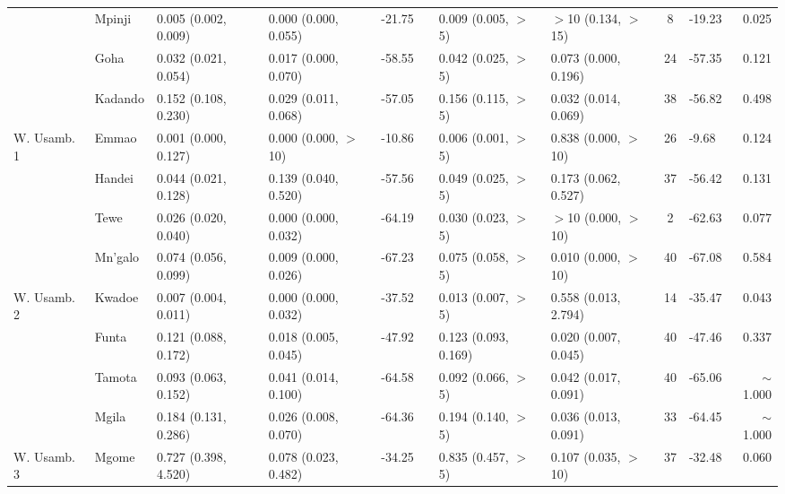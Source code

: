 \begin{tabular}{llllllllclr}
            & Mpinji          & 0.005 (0.002, 0.009)   & 0.000 (0.000, 0.055)   & -21.75   & & 0.009 (0.005, $>$5)   & $>$10 (0.134, $>$15)   & 8  & -19.23 & 0.025\\
            & Goha            & 0.032 (0.021, 0.054)   & 0.017 (0.000, 0.070)   & -58.55   & & 0.042 (0.025, $>$5)   & 0.073 (0.000, 0.196)   & 24 & -57.35 & 0.121\\
            & Kadando         & 0.152 (0.108, 0.230)   & 0.029 (0.011, 0.068)   & -57.05   & & 0.156 (0.115, $>$5)   & 0.032 (0.014, 0.069)   & 38 & -56.82 & 0.498\\
\cmidrule{2-11}
W. Usamb. 1 & Emmao           & 0.001 (0.000, 0.127)   & 0.000 (0.000, $>$10)   & -10.86   & & 0.006 (0.001, $>$5)   & 0.838 (0.000, $>$10)   & 26 &  -9.68 & 0.124\\
            & Handei          & 0.044 (0.021, 0.128)   & 0.139 (0.040, 0.520)   & -57.56   & & 0.049 (0.025, $>$5)   & 0.173 (0.062, 0.527)   & 37 & -56.42 & 0.131\\
            & Tewe            & 0.026 (0.020, 0.040)   & 0.000 (0.000, 0.032)   & -64.19   & & 0.030 (0.023, $>$5)   & $>$10 (0.000, $>$10)   & 2  & -62.63 & 0.077\\
            & Mn'galo         & 0.074 (0.056, 0.099)   & 0.009 (0.000, 0.026)   & -67.23   & & 0.075 (0.058, $>$5)   & 0.010 (0.000, $>$10)   & 40 & -67.08 & 0.584\\
\cmidrule{2-11}
W. Usamb. 2 & Kwadoe          & 0.007 (0.004, 0.011)   & 0.000 (0.000, 0.032)   & -37.52   & & 0.013 (0.007, $>$5)   & 0.558 (0.013, 2.794)   & 14 & -35.47 & 0.043\\
            & Funta           & 0.121 (0.088, 0.172)   & 0.018 (0.005, 0.045)   & -47.92   & & 0.123 (0.093, 0.169)  & 0.020 (0.007, 0.045)   & 40 & -47.46 & 0.337\\
            & Tamota          & 0.093 (0.063, 0.152)   & 0.041 (0.014, 0.100)   & -64.58   & & 0.092 (0.066, $>$5)   & 0.042 (0.017, 0.091)   & 40 & -65.06 & $\sim$1.000\\
            & Mgila           & 0.184 (0.131, 0.286)   & 0.026 (0.008, 0.070)   & -64.36   & & 0.194 (0.140, $>$5)   & 0.036 (0.013, 0.091)   & 33 & -64.45 & $\sim$1.000\\
\cmidrule{2-11}
W. Usamb. 3 & Mgome           & 0.727 (0.398, 4.520)   & 0.078 (0.023, 0.482)   & -34.25   & & 0.835 (0.457, $>$5)   & 0.107 (0.035, $>$10)   & 37 & -32.48 & 0.060\\
\bottomrule
\end{tabular}